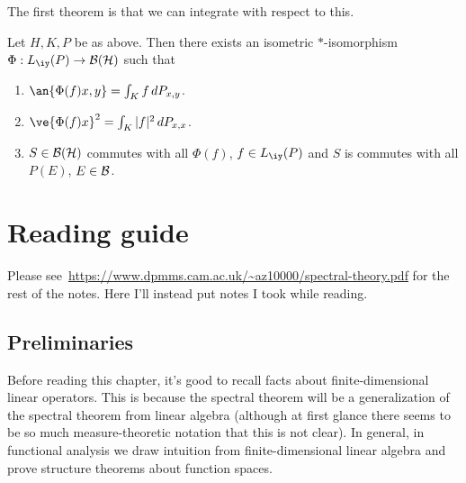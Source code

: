 The first theorem is that we can integrate with respect to this.
\begin{thm}
Let $H, K, P$ be as above. Then there exists an isometric $*$-isomorphism $\Phi:L_{\iy}(P)\to \cal B(H)$ such that 
\begin{enumerate}
\item
$\an{\Phi(f)x,y}=\int_K f\,dP_{x,y}$.
\item
$\ve{\Phi(f) x}^2=\int_K|f|^2\,dP_{x,x}$.
\item
$S\in \cal B(H)$ commutes with all $\Phi(f)$, $f\in L_{\iy}(P)$ and $S$ is commutes with all $P(E)$, $E\in \cal B$.
\end{enumerate}
\end{thm}
\section{Reading guide}
Please see~\url{https://www.dpmms.cam.ac.uk/\~az10000/spectral-theory.pdf} for the rest of the notes. Here I'll instead put notes I took while reading.

\subsection{Preliminaries}
Before reading this chapter, it's good to recall facts about finite-dimensional linear operators. This is because the spectral theorem will be a generalization of the spectral theorem from linear algebra (although at first glance there seems to be so much measure-theoretic notation that this is not clear). In general, in functional analysis we draw intuition from finite-dimensional linear algebra and prove structure theorems about function spaces.

